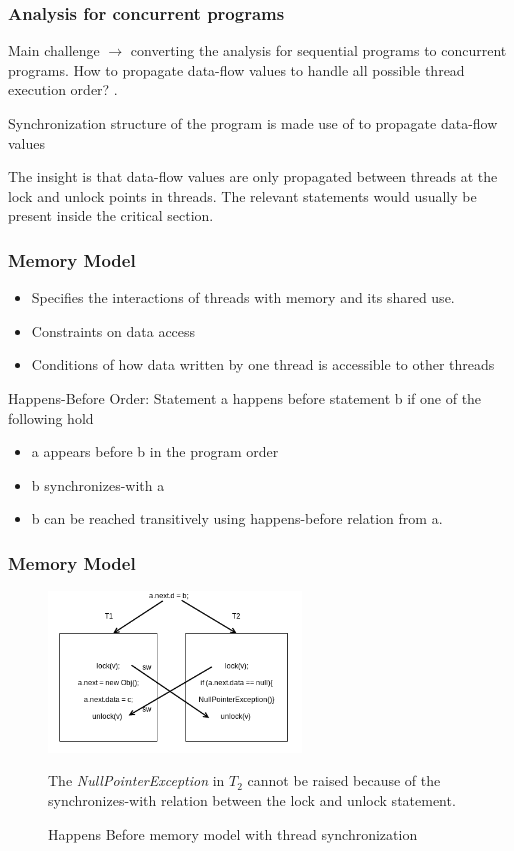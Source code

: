 \documentclass{beamer}
\begin{document}
\begin{frame}
\frametitle{Analysis for concurrent programs}
Main challenge $\rightarrow$ converting the analysis for sequential programs to concurrent programs. How to propagate data-flow values to handle all possible thread execution order? .

\vspace{\baselineskip}
Synchronization structure of the program is made use of to propagate data-flow values

\vspace{\baselineskip}
The insight is that data-flow values are only propagated between threads at the lock and unlock points in threads. The relevant statements would usually be present inside the critical section.

\end{frame}  
  
  \begin{frame}
  \frametitle{Memory Model}
	\begin{itemize}
		\item Specifies the interactions of threads with memory and its shared use.
		\item Constraints on data access  
		\item Conditions of how data written by one thread is accessible to other threads
	\end{itemize}
	Happens-Before Order: Statement  a happens before statement b if one of the following hold
	\begin{itemize}
		\item a appears before b in the program order
		\item b synchronizes-with a
		\item b can be reached transitively using happens-before relation from a.
	\end{itemize} 

  \end{frame}
  
\begin{frame}
\frametitle{Memory Model}

\begin{figure}
	\centering
	\includegraphics[width=0.6\textwidth]{Figures/sync_threads.png}
	\caption{Happens Before memory model with thread synchronization}
	\label{fig:happensbefore1}
	
	The \emph{NullPointerException} in $T_2$ cannot be raised because of the synchronizes-with relation between the lock and unlock statement. 
	
\end{figure}

\end{frame}
\end{document}

